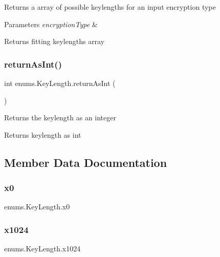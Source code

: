 Returns a array of possible keylengths for an input encryption type 
\begin{DoxyParams}{Parameters}
{\em encryption\+Type} & \\
\hline
\end{DoxyParams}
\begin{DoxyReturn}{Returns}
fitting keylengths array 
\end{DoxyReturn}
\mbox{\label{enumenums_1_1_key_length_a0f7b59831fc63110038baa6e444eddb1}} 
\subsubsection{\texorpdfstring{return\+As\+Int()}{returnAsInt()}}
{\footnotesize\ttfamily int enums.\+Key\+Length.\+return\+As\+Int (\begin{DoxyParamCaption}{ }\end{DoxyParamCaption})}

Returns the keylength as an integer \begin{DoxyReturn}{Returns}
keylength as int 
\end{DoxyReturn}


\subsection{Member Data Documentation}
\mbox{\label{enumenums_1_1_key_length_a08414039b2bd5688cf9779cce0df9b09}} 
\subsubsection{\texorpdfstring{x0}{x0}}
{\footnotesize\ttfamily enums.\+Key\+Length.\+x0}

\mbox{\label{enumenums_1_1_key_length_a7076a11d36efd087c9dbdf88c50b1af7}} 
\subsubsection{\texorpdfstring{x1024}{x1024}}
{\footnotesize\ttfamily enums.\+Key\+Length.\+x1024}

